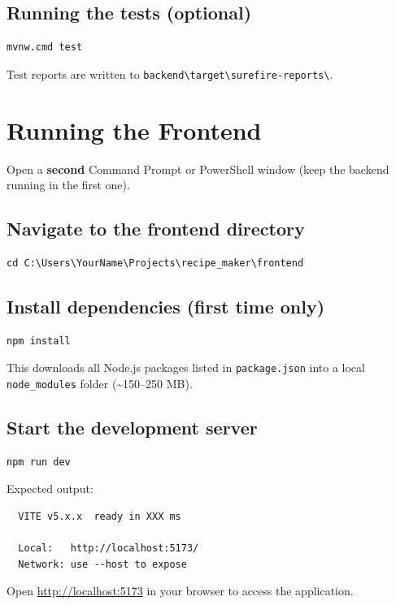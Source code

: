 \documentclass[12pt,a4paper]{article}
\begin{document}
\subsection{Running the tests (optional)}
\begin{lstlisting}
mvnw.cmd test
\end{lstlisting}
Test reports are written to
\texttt{backend\textbackslash target\textbackslash surefire-reports\textbackslash}.

\section{Running the Frontend}

Open a \textbf{second} Command Prompt or PowerShell window (keep the backend
running in the first one).

\subsection{Navigate to the frontend directory}
\begin{lstlisting}
cd C:\Users\YourName\Projects\recipe_maker\frontend
\end{lstlisting}

\subsection{Install dependencies (first time only)}
\begin{lstlisting}
npm install
\end{lstlisting}

This downloads all Node.js packages listed in \texttt{package.json} into a
local \texttt{node\_modules} folder (\textasciitilde{}150--250 MB).

\subsection{Start the development server}
\begin{lstlisting}
npm run dev
\end{lstlisting}

Expected output:
\begin{lstlisting}
  VITE v5.x.x  ready in XXX ms

  Local:   http://localhost:5173/
  Network: use --host to expose
\end{lstlisting}

Open \url{http://localhost:5173} in your browser to access the application.
\end{document}
